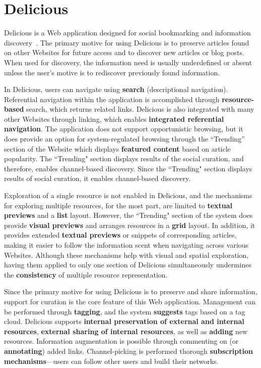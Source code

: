 {\section{Delicious}
Delicious is a Web application designed for social bookmarking and information discovery~\cite{rader2008influences, tesconi2008semantify}. The primary motive for using Delicious is to preserve articles found on other Websites for future access and to discover new articles or blog posts. When used for discovery, the information need is usually underdefined or absent unless the user's motive is to rediscover previously found information.   

In Delicious, users can navigate using \textbf{search} (descriptional navigation). Referential navigation within the application is accomplished through \textbf{resource-based} search, which returns related links. Delicious is also integrated with many other Websites through linking, which enables \textbf{integrated referential navigation}. The application does not support opportunistic browsing, but it does provide an option for system-regulated browsing through the ``Trending'' section of the Website which displays \textbf{featured content} based on article popularity. The ``Trending" section displays results of the social curation, and therefore, enables channel-based discovery. Since the ``Trending" section displays results of social curation, it enables channel-based discovery.

Exploration of a single resource is not enabled in Delicious, and the mechanisms for exploring multiple resources, for the most part, are limited to \textbf{textual previews} and a \textbf{list} layout. However, the ``Trending" section of the system does provide \textbf{visual previews} and arranges resources in a \textbf{grid} layout. In addition, it provides extended \textbf{textual previews} or snippets of corresponding articles, making it easier to follow the information scent when navigating across various Websites. Although these mechanisms help with visual and spatial exploration, having them applied to only one section of Delicious simultaneously undermines the \textbf{consistency} of multiple resource representation. 

Since the primary motive for using Delicious is to preserve and share information, support for curation is the core feature of this Web application. Management can be performed through \textbf{tagging}, and the system \textbf{suggests} tags based on a tag cloud. Delicious supports \textbf{internal preservation of external and internal resources}, \textbf{external sharing of internal resources}, as well as \textbf{adding} new resources. Information augmentation is possible through commenting on (or \textbf{annotating}) added links. Channel-picking is performed thorough \textbf{subscription mechanisms}---users can follow other users and build their networks. 

}
